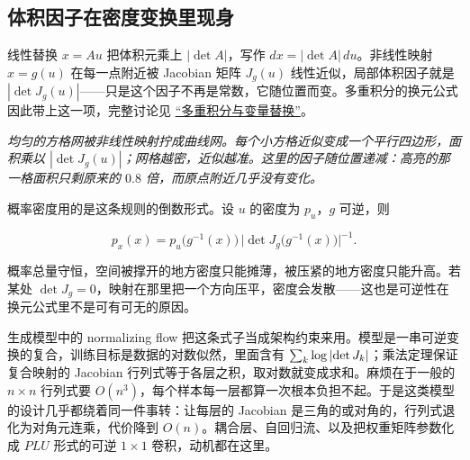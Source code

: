 \subsection{体积因子在密度变换里现身}

线性替换 \(x=Au\) 把体积元乘上 \(|\det A|\)，写作 \(dx=|\det A|\,du\)。非线性映射 \(x=g(u)\) 在每一点附近被 Jacobian 矩阵 \(J_g(u)\) 线性近似，局部体积因子就是 \(|\det J_g(u)|\)——只是这个因子不再是常数，它随位置而变。多重积分的换元公式因此带上这一项，完整讨论见 \hyperref[sec:02-Calculus/06-Multivariable-Calculus/07]{``多重积分与变量替换''}。

\begin{center}

\emph{均匀的方格网被非线性映射拧成曲线网。每个小方格近似变成一个平行四边形，面积乘以 \(|\det J_g(u)|\)；网格越密，近似越准。这里的因子随位置递减：高亮的那一格面积只剩原来的 \(0.8\) 倍，而原点附近几乎没有变化。}
\end{center}

概率密度用的是这条规则的倒数形式。设 \(u\) 的密度为 \(p_u\)，\(g\) 可逆，则

\[
p_x(x)=p_u\bigl(g^{-1}(x)\bigr)\,\bigl|\det J_g\bigl(g^{-1}(x)\bigr)\bigr|^{-1}.
\]

概率总量守恒，空间被撑开的地方密度只能摊薄，被压紧的地方密度只能升高。若某处 \(\det J_g=0\)，映射在那里把一个方向压平，密度会发散——这也是可逆性在换元公式里不是可有可无的原因。

生成模型中的 normalizing flow 把这条式子当成架构约束来用。模型是一串可逆变换的复合，训练目标是数据的对数似然，里面含有 \(\sum_k\log\left|\det J_k\right|\)；乘法定理保证复合映射的 Jacobian 行列式等于各层之积，取对数就变成求和。麻烦在于一般的 \(n\times n\) 行列式要 \(O(n^3)\)，每个样本每一层都算一次根本负担不起。于是这类模型的设计几乎都绕着同一件事转：让每层的 Jacobian 是三角的或对角的，行列式退化为对角元连乘，代价降到 \(O(n)\)。耦合层、自回归流、以及把权重矩阵参数化成 \(PLU\) 形式的可逆 \(1\times1\) 卷积，动机都在这里。

